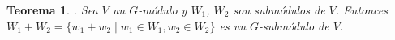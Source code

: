 \documentclass[12pt]{book}
\newtheorem{theorem}{Teorema}[section]
\theoremstyle{definition}
\newtheorem{definition}[theorem]{Definición}
\newcounter{in}
\newcounter{ini}
\begin{document}
\begin{theorem}{.}
  \label{suma-submodulo}
  Sea $V$ un $G$-módulo y $W_{1}$, $W_{2}$ son submódulos de
  $V$. Entonces $W_{1}+W_{2}=\{w_{1}+w_{2}\mid w_{1}\in W_{1},
  w_{2}\in W_{2}\}$ es un $G$-submódulo de $V$.
\end{theorem}




\end{document}
